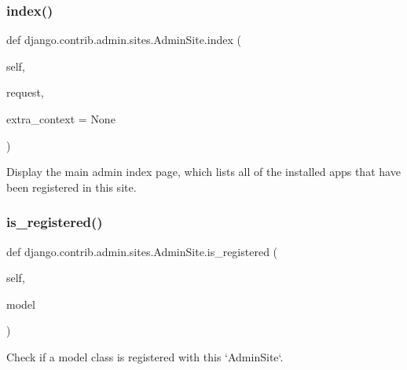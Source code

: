 \subsubsection{\texorpdfstring{index()}{index()}}
{\footnotesize\ttfamily def django.\+contrib.\+admin.\+sites.\+Admin\+Site.\+index (\begin{DoxyParamCaption}\item[{}]{self,  }\item[{}]{request,  }\item[{}]{extra\+\_\+context = {\ttfamily None} }\end{DoxyParamCaption})}

\begin{DoxyVerb}Display the main admin index page, which lists all of the installed
apps that have been registered in this site.
\end{DoxyVerb}
 \mbox{\label{classdjango_1_1contrib_1_1admin_1_1sites_1_1_admin_site_ac1a792f79437cded58c47657080621c5}} 
\subsubsection{\texorpdfstring{is\+\_\+registered()}{is\_registered()}}
{\footnotesize\ttfamily def django.\+contrib.\+admin.\+sites.\+Admin\+Site.\+is\+\_\+registered (\begin{DoxyParamCaption}\item[{}]{self,  }\item[{}]{model }\end{DoxyParamCaption})}

\begin{DoxyVerb}Check if a model class is registered with this `AdminSite`.
\end{DoxyVerb}
 \mbox{\label{classdjango_1_1contrib_1_1admin_1_1sites_1_1_admin_site_a082ff3962c1de33df9c12d5b1bfa732d}} 
